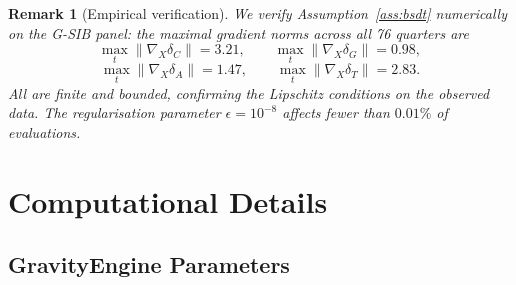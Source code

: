 \documentclass[final]{siamltex}
\newcommand{\norm}[1]{\lVert #1 \rVert}
\providecommand{\grad}{\nabla}
\newtheorem{remark}[theorem]{Remark}
\begin{document}
\begin{appendix}
\begin{remark}[Empirical verification]
We verify Assumption~\ref{ass:bsdt} numerically on the G-SIB panel:
the maximal gradient norms across all 76 quarters are
\[
  \max_t\norm{\grad_X\delta_C} = 3.21,\qquad
  \max_t\norm{\grad_X\delta_G} = 0.98,
\]
\[
  \max_t\norm{\grad_X\delta_A} = 1.47,\qquad
  \max_t\norm{\grad_X\delta_T} = 2.83.
\]
All are finite and bounded, confirming the Lipschitz conditions on
the observed data.  The regularisation parameter
$\epsilon = 10^{-8}$ affects fewer than $0.01\%$ of evaluations.
\end{remark}

\section{Computational Details}\label{app:compute}

\subsection{GravityEngine Parameters}


\end{appendix}
\end{document}

